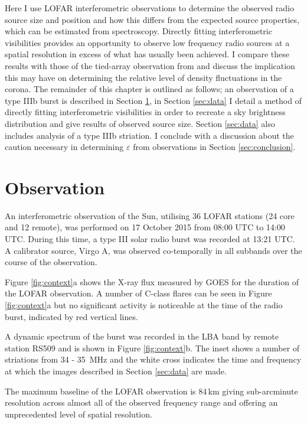 Here I use LOFAR interferometric observations to determine the observed radio source size and position and how this differs from the expected source properties, which can be estimated from spectroscopy. %
Directly fitting interferometric visibilities provides an opportunity to observe low frequency radio sources at a spatial resolution in excess of what has usually been achieved. I compare these results with those of the tied-array observation from \cite{Kontar2017} and discuss the implication this may have on determining the relative level of density fluctuations in the corona. 
The remainder of this chapter is outlined as follows; an observation of a type IIIb burst is described in Section \ref{sec:obs}, in Section \ref{sec:data} I detail a method of directly fitting interferometric visibilities in order to recreate a sky brightness distribution and give results of observed source size. Section \ref{sec:data} also includes analysis of a type IIIb striation. I conclude with a discussion about the caution necessary in determining $\varepsilon$ from observations in Section \ref{sec:conclusion}.

\section{Observation} \label{sec:obs}
An interferometric observation of the Sun, utilising 36 LOFAR stations (24 core and 12 remote), was performed on 17 October 2015 from 08:00 UTC to 14:00 UTC. During this time, a type III solar radio burst was recorded  at 13:21 UTC. A calibrator source, Virgo A, was observed co-temporally in all subbands over the course of the observation.

Figure \ref{fig:context}a shows the X-ray flux measured by GOES for the duration of the LOFAR observation. A number of C-class flares can be seen in Figure \ref{fig:context}a but no significant activity is noticeable at the time of the radio burst, indicated by red vertical lines.

A dynamic spectrum of the burst was recorded in the LBA band by remote station RS509 and is shown in Figure \ref{fig:context}b. The inset shows a number of striations from 34 - 35~MHz and the white cross indicates the time and frequency at which the images described in Section \ref{sec:data} are made.

The maximum baseline of the LOFAR observation is 84\,km giving sub-arcminute resolution across almost all of the observed frequency range and offering an unprecedented level of spatial resolution.

